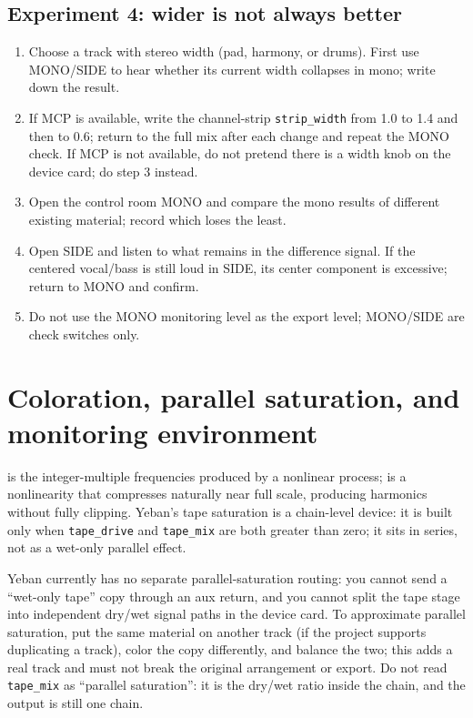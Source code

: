 \subsection{Experiment 4: wider is not always better}

\begin{enumerate}
  \item Choose a track with stereo width (pad, harmony, or drums). First use MONO/SIDE to hear whether its current width collapses in mono; write down the result.
  \item If MCP is available, write the channel-strip \texttt{strip\_width} from 1.0 to 1.4 and then to 0.6; return to the full mix after each change and repeat the MONO check. If MCP is not available, do not pretend there is a width knob on the device card; do step 3 instead.
  \item Open the control room MONO and compare the mono results of different existing material; record which loses the least.
  \item Open SIDE and listen to what remains in the difference signal. If the centered vocal/bass is still loud in SIDE, its center component is excessive; return to MONO and confirm.
  \item Do not use the MONO monitoring level as the export level; MONO/SIDE are check switches only.
\end{enumerate}

\section{Coloration, parallel saturation, and monitoring environment}

 is the integer-multiple frequencies produced by a nonlinear process;  is a nonlinearity that compresses naturally near full scale, producing harmonics without fully clipping. Yeban's tape saturation is a chain-level device: it is built only when \texttt{tape\_drive} and \texttt{tape\_mix} are both greater than zero; it sits in series, not as a wet-only parallel effect.

Yeban currently has no separate parallel-saturation routing: you cannot send a ``wet-only tape'' copy through an aux return, and you cannot split the tape stage into independent dry/wet signal paths in the device card. To approximate parallel saturation, put the same material on another track (if the project supports duplicating a track), color the copy differently, and balance the two; this adds a real track and must not break the original arrangement or export. Do not read \texttt{tape\_mix} as ``parallel saturation'': it is the dry/wet ratio inside the chain, and the output is still one chain.

